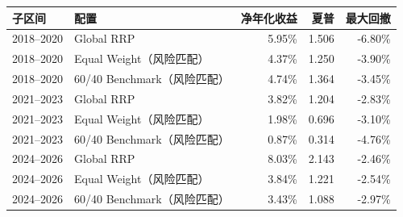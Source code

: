 \begin{tabular}{llrrr}
\toprule
子区间 & 配置 & 净年化收益 & 夏普 & 最大回撤\\\midrule
2018--2020 & Global RRP & 5.95\% & 1.506 & -6.80\%\\
2018--2020 & Equal Weight（风险匹配） & 4.37\% & 1.250 & -3.90\%\\
2018--2020 & 60/40 Benchmark（风险匹配） & 4.74\% & 1.364 & -3.45\%\\
2021--2023 & Global RRP & 3.82\% & 1.204 & -2.83\%\\
2021--2023 & Equal Weight（风险匹配） & 1.98\% & 0.696 & -3.10\%\\
2021--2023 & 60/40 Benchmark（风险匹配） & 0.87\% & 0.314 & -4.76\%\\
2024--2026 & Global RRP & 8.03\% & 2.143 & -2.46\%\\
2024--2026 & Equal Weight（风险匹配） & 3.84\% & 1.221 & -2.54\%\\
2024--2026 & 60/40 Benchmark（风险匹配） & 3.43\% & 1.088 & -2.97\%\\
\bottomrule
\end{tabular}